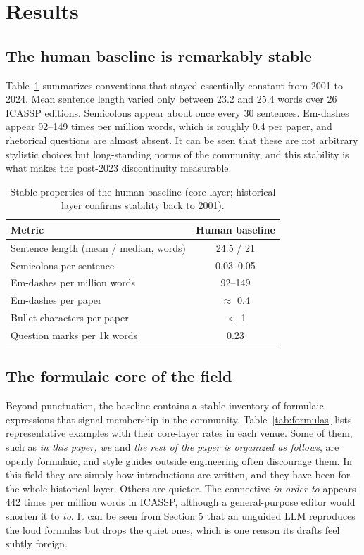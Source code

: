 \documentclass[a4paper,10pt,twocolumn]{article}
\begin{document}
\section{Results}

\subsection{The human baseline is remarkably stable}

Table~\ref{tab:baseline} summarizes conventions that stayed essentially constant from 2001 to 2024. Mean sentence length varied only between 23.2 and 25.4 words over 26 ICASSP editions. Semicolons appear about once every 30 sentences. Em-dashes appear 92--149 times per million words, which is roughly 0.4 per paper, and rhetorical questions are almost absent. It can be seen that these are not arbitrary stylistic choices but long-standing norms of the community, and this stability is what makes the post-2023 discontinuity measurable.

\begin{table}[t]
\centering
\caption{Stable properties of the human baseline (core layer; historical layer confirms stability back to 2001).}
\label{tab:baseline}
\small
\begin{tabular}{lc}
\toprule
Metric & Human baseline \\
\midrule
Sentence length (mean / median, words) & 24.5 / 21 \\
Semicolons per sentence & 0.03--0.05 \\
Em-dashes per million words & 92--149 \\
Em-dashes per paper & $\approx$ 0.4 \\
Bullet characters per paper & $<$ 1 \\
Question marks per 1k words & 0.23 \\
\bottomrule
\end{tabular}
\end{table}

\subsection{The formulaic core of the field}

Beyond punctuation, the baseline contains a stable inventory of formulaic expressions that signal membership in the community. Table~\ref{tab:formulas} lists representative examples with their core-layer rates in each venue. Some of them, such as \emph{in this paper, we} and \emph{the rest of the paper is organized as follows}, are openly formulaic, and style guides outside engineering often discourage them. In this field they are simply how introductions are written, and they have been for the whole historical layer. Others are quieter. The connective \emph{in order to} appears 442 times per million words in ICASSP, although a general-purpose editor would shorten it to \emph{to}. It can be seen from Section 5 that an unguided LLM reproduces the loud formulas but drops the quiet ones, which is one reason its drafts feel subtly foreign.
\end{document}
